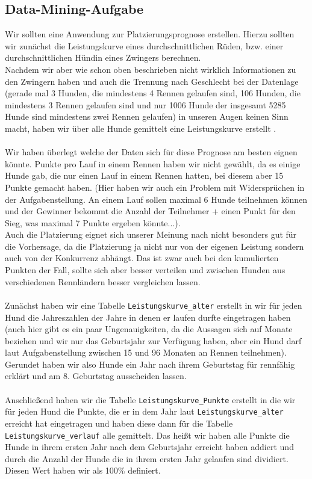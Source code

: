 \documentclass[10pt,a4paper]{article}
\begin{document}
	\subsection{Data-Mining-Aufgabe}
		Wir sollten eine Anwendung zur Platzierungsprognose erstellen. Hierzu sollten wir zunächst die Leistungskurve eines durchschnittlichen Rüden, bzw. einer durchschnittlichen Hündin eines Zwingers berechnen. \\
		Nachdem wir aber wie schon oben beschrieben nicht wirklich Informationen zu den Zwingern haben und auch die Trennung nach Geschlecht  bei der Datenlage (gerade mal 3 Hunden, die mindestens 4 Rennen gelaufen sind, 106 Hunden, die mindestens 3 Rennen gelaufen sind und nur 1006 Hunde der insgesamt 5285 Hunde sind mindestens zwei Rennen gelaufen) in unseren Augen keinen Sinn macht, haben wir über alle Hunde gemittelt eine Leistungskurve erstellt . \\
		\\
		Wir haben überlegt welche der Daten sich für diese Prognose am besten eignen könnte. Punkte pro Lauf in einem Rennen haben wir nicht gewählt, da es einige Hunde gab, die nur einen Lauf in einem Rennen hatten, bei diesem aber 15 Punkte gemacht haben. (Hier haben wir auch ein Problem mit Widersprüchen in der Aufgabenstellung. An einem Lauf sollen maximal 6 Hunde teilnehmen können und der Gewinner bekommt die Anzahl der Teilnehmer + einen Punkt für den Sieg, was maximal 7 Punkte ergeben könnte...).\\
		Auch die Platzierung eignet sich unserer Meinung nach nicht besonders gut für die Vorhersage, da die Platzierung ja nicht nur von der eigenen Leistung sondern auch von der Konkurrenz abhängt. Das ist zwar auch bei den kumulierten Punkten der Fall, sollte sich aber besser verteilen und zwischen Hunden aus verschiedenen Rennländern besser vergleichen lassen.\\
		\\
		Zunächst haben wir eine Tabelle \texttt{Leistungskurve\_alter} erstellt in wir für jeden Hund die Jahreszahlen der Jahre in denen er laufen durfte eingetragen haben (auch hier gibt es ein paar Ungenauigkeiten, da die Aussagen sich auf Monate beziehen und wir nur das Geburtsjahr zur Verfügung haben, aber ein Hund darf laut Aufgabenstellung zwischen 15 und 96 Monaten an Rennen teilnehmen). Gerundet haben wir also Hunde ein Jahr nach ihrem Geburtstag für rennfähig erklärt und am 8. Geburtstag ausscheiden lassen. \\
		\\
		Anschließend haben wir die Tabelle \texttt{Leistungskurve\_Punkte} erstellt in die wir für jeden Hund die Punkte, die er in dem Jahr laut \texttt{Leistungskurve\_alter} erreicht hat eingetragen und haben diese dann für die Tabelle \texttt{Leistungskurve\_verlauf} alle gemittelt. Das heißt wir haben alle Punkte die Hunde in ihrem ersten Jahr nach dem Geburtsjahr erreicht haben addiert und durch die Anzahl der Hunde die in ihrem ersten Jahr gelaufen sind dividiert. Diesen Wert haben wir als 100\% definiert.\\ \\
\end{document}
